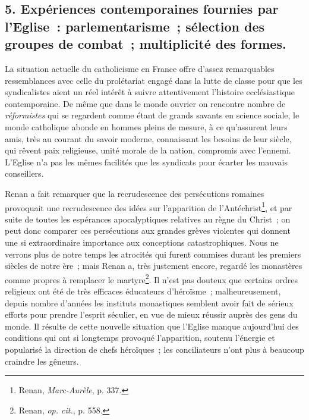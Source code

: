 \documentclass[french,twoside]{book} %
\begin{document}
 \subsection[{5. Expériences contemporaines fournies par l’Eglise : parlementarisme ; sélection des groupes de combat ; multiplicité des formes.}]{5. Expériences contemporaines fournies par l’Eglise : parlementarisme ; sélection des groupes de combat ; multiplicité des formes.}
\label{p40}
\noindent La situation actuelle du catholicisme en France offre d’assez remarquables ressemblances avec celle du prolétariat engagé dans la lutte de classe pour que les syndicalistes aient un réel intérêt à suivre attentivement l’histoire ecclésiastique contemporaine. De même que dans le monde ouvrier on rencontre nombre de \emph{réformistes} qui se regardent comme étant de grands savants en science sociale, le monde catholique abonde en hommes pleins de mesure, à ce qu’assurent leurs amis, très au courant du savoir moderne, connaissant les besoins de leur siècle, qui rêvent paix religieuse, unité morale de la nation, compromis avec l’ennemi. L’Eglise n’a pas les mêmes facilités que les syndicats pour écarter les mauvais conseillers.\par
Renan a fait remarquer que la recrudescence des persécutions romaines provoquait une recrudescence des idées sur l’apparition de l’Antéchrist\footnote{ \noindent Renan, \emph{Marc-Aurèle}, p. 337.
 }, et par suite de toutes les espérances apocalyptiques relatives au règne du Christ ; on peut donc comparer ces persécutions aux grandes grèves violentes qui donnent une si extraordinaire importance aux conceptions catastrophiques. Nous ne verrons plus de notre temps les atrocités qui furent commises durant les premiers siècles de notre ère ; mais Renan a, très justement encore, regardé les monastères comme propres à remplacer le martyre\footnote{ \noindent Renan, \emph{op. cit.}, p. 558.
 }. Il n’est pas  douteux que certains ordres religieux ont été de très efficaces éducateurs d’héroïsme ; malheureusement, depuis nombre d’années les instituts monastiques semblent avoir fait de sérieux efforts pour prendre l’esprit séculier, en vue de mieux réussir auprès des gens du monde. Il résulte de cette nouvelle situation que l’Eglise manque aujourd’hui des conditions qui ont si longtemps provoqué l’apparition, soutenu l’énergie et popularisé la direction de chefs héroïques ; les conciliateurs n’ont plus à beaucoup craindre les gêneurs.\par
\end{document}
